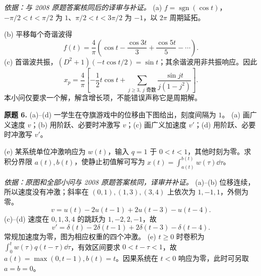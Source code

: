 \begin{solution}
\textit{依据：与 2008 原题答案核同后的译审与补证。}
(a) $f=\operatorname{sgn}(\cos t)$，$-\pi/2<t<\pi/2$ 为 $1$、$\pi/2<t<3\pi/2$ 为 $-1$，以 $2\pi$ 周期延拓。
\begin{center}\end{center}
(b) 平移每个奇谐波得
\[f(t)=\frac4\pi\left(\cos t-\frac{\cos3t}{3}+\frac{\cos5t}{5}-\cdots\right).\]
(c) 首谐波共振，$(D^2+1)(-t\cos t/2)=\sin t$；其余谐波用非共振响应。因此
\[x_p=\frac4\pi\left[-\frac12t\cos t+\sum_{j\ge3,\ j\text{ 奇数}}\frac{\sin jt}{j(1-j^2)}\right].\]
本小问仅要求一个解，解含增长项，不能错误声称它是周期解。
\end{solution}
\begin{exercise}\label{cw:prfinal-6}\textbf{原题 6.}
(a)--(d) 一学生在夺旗游戏中的位移由下图给出，刻度间隔为 $1$。
(a) 画广义速度 $v$；(b) 用阶跃、必要时冲激写 $v$；(c) 画广义加速度 $v'$；(d) 用阶跃、必要时冲激写 $v'$。
\begin{center}\end{center}
(e) 某系统单位冲激响应为 $w(t)$，输入 $q=1$ 于 $0<t<1$，其他时刻为零。求积分界限 $a(t),b(t)$，使静止初值解可写为 $x(t)=\int_{a(t)}^{b(t)}w(\tau)\dd\tau$。
\end{exercise}
\begin{solution}
\textit{依据：原图和全部小问与 2008 原题答案核同，译审并补证。}
(a)--(b) 位移连续，所以速度没有冲激；斜率在 $(0,1),(1,3),(3,4)$ 上依次为 $1,-1,1$，外侧为零。
\[v=u(t)-2u(t-1)+2u(t-3)-u(t-4).\]
(c)--(d) 速度在 $0,1,3,4$ 的跳跃为 $1,-2,2,-1$，故
\[v'=\delta(t)-2\delta(t-1)+2\delta(t-3)-\delta(t-4).\]
常规加速度为零，图为相应权重的四个冲激。
\ODEExamMotionDerivatives
(e) $t\ge0$ 时卷积为 $\int_0^tw(\tau)q(t-\tau)\dd\tau$，有效区间要求 $0<t-\tau<1$，故 $a(t)=\max(0,t-1),b(t)=t$。因果系统在 $t<0$ 响应为零，此时可另取 $a=b=0$。
\end{solution}
